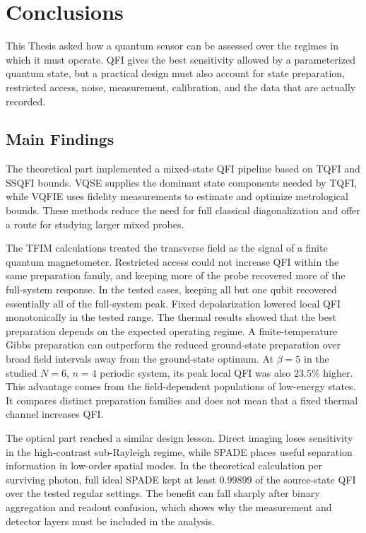 \chapter{Conclusions}
\label{ch:conclusions}

This Thesis asked how a quantum sensor can be assessed over the regimes in which it must operate.  QFI gives the best sensitivity allowed by a parameterized quantum state, but a practical design must also account for state preparation, restricted access, noise, measurement, calibration, and the data that are actually recorded.

\section{Main Findings}

The theoretical part implemented a mixed-state QFI pipeline based on TQFI and SSQFI bounds.  VQSE supplies the dominant state components needed by TQFI, while VQFIE uses fidelity measurements to estimate and optimize metrological bounds.  These methods reduce the need for full classical diagonalization and offer a route for studying larger mixed probes.

The TFIM calculations treated the transverse field as the signal of a finite quantum magnetometer.  Restricted access could not increase QFI within the same preparation family, and keeping more of the probe recovered more of the full-system response.  In the tested cases, keeping all but one qubit recovered essentially all of the full-system peak.  Fixed depolarization lowered local QFI monotonically in the tested range.  The thermal results showed that the best preparation depends on the expected operating regime.  A finite-temperature Gibbs preparation can outperform the reduced ground-state preparation over broad field intervals away from the ground-state optimum.  At $\beta=5$ in the studied $N=6$, $n=4$ periodic system, its peak local QFI was also $23.5\%$ higher.  This advantage comes from the field-dependent populations of low-energy states.  It compares distinct preparation families and does not mean that a fixed thermal channel increases QFI.

The optical part reached a similar design lesson.  Direct imaging loses sensitivity in the high-contrast sub-Rayleigh regime, while SPADE places useful separation information in low-order spatial modes.  In the theoretical calculation per surviving photon, full ideal SPADE kept at least $0.99899$ of the source-state QFI over the tested regular settings.  The benefit can fall sharply after binary aggregation and readout confusion, which shows why the measurement and detector layers must be included in the analysis.

